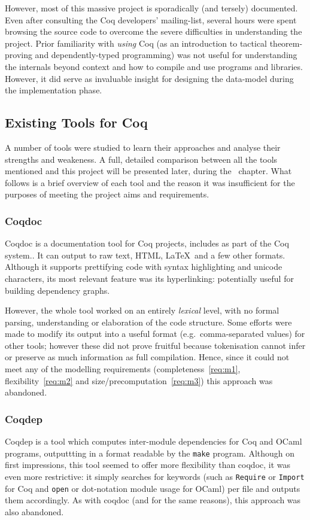 However, most of this massive project is sporadically (and tersely) documented.
Even after consulting the Coq developers' mailing-list, several hours were spent
browsing the source code to overcome the severe difficulties in understanding
the project. Prior familiarity with \emph{using} Coq (as an introduction to
tactical theorem-proving and dependently-typed programming) was not useful for
understanding the internals beyond context and how to compile and use programs
and libraries. However, it did serve as invaluable insight for designing the
data-model during the implementation phase.

\subsection{Existing Tools for Coq}\label{prep:coqtools}

A number of tools were studied to learn their approaches and analyse their
strengths and weakeness. A full, detailed comparison between all the tools
mentioned and this project will be presented later, during
the~ chapter.  What follows is a brief overview of each tool
and the reason it was insufficient for the purposes of meeting the project aims
and requirements.

\subsubsection{Coqdoc}

Coqdoc is a documentation tool for Coq projects, includes as part of the Coq
system.. It can output to raw text, HTML, \LaTeX~and a few other formats.
Although it supports prettifying code with syntax highlighting and unicode
characters, its most relevant feature was its hyperlinking: potentially useful
for building dependency graphs.

However, the whole tool worked on an entirely \emph{lexical} level, with no
formal parsing, understanding or elaboration of the code structure. Some efforts
were made to modify its output into a useful format (e.g.\ comma-separated
values) for other tools; however these did not prove fruitful because
tokenisation cannot infer or preserve as much information as full compilation.
Hence, since it could not meet any of the modelling requirements
(completeness~\ref{req:m1}, flexibility~\ref{req:m2} and
size/precomputation~\ref{req:m3}) this approach was abandoned.

\subsubsection{Coqdep}
Coqdep is a tool which computes inter-module dependencies for Coq and
OCaml programs, outputtting in a format readable by the \texttt{make} program.
Although on first impressions, this tool seemed to offer more flexibility than
coqdoc, it was even more restrictive: it simply searches for keywords (such as
\texttt{Require} or \texttt{Import} for Coq  and \texttt{open} or dot-notation
module usage for OCaml) per file and outputs them accordingly.  As with coqdoc
(and for the same reasons), this approach was also abandoned.

